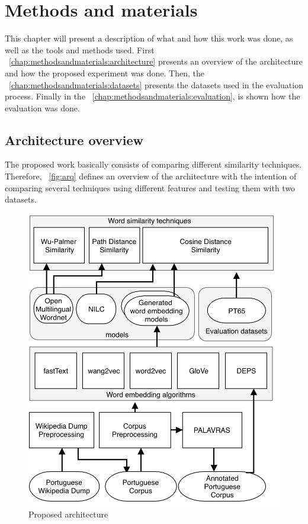 \section{Methods and materials}\label{chap:methodsandmaterials}

This chapter will present a description of what and how this work was done, as well as the tools and methods used. First ~\autoref{chap:methodsandmaterials:architecture} presents an overview of the architecture and how the proposed experiment was done. Then, the ~\autoref{chap:methodsandmaterials:datasets} presents the datasets used in the evaluation process. Finally in the 
~\autoref{chap:methodsandmaterials:evaluation}, is shown how the evaluation was done.

\subsection{Architecture overview}\label{chap:methodsandmaterials:architecture}

The proposed work basically consists of comparing different similarity techniques. Therefore, ~\autoref{fig:arq} defines an overview of the architecture with the intention of comparing several techniques using different features and testing them with two datasets.

\begin{figure}[h]
	\caption{Proposed architecture}
	\label{fig:arq}
	\centering%
	\begin{minipage}{.8\textwidth}
		\includegraphics[width=\textwidth]{arq.png}
	\end{minipage}
\end{figure}

